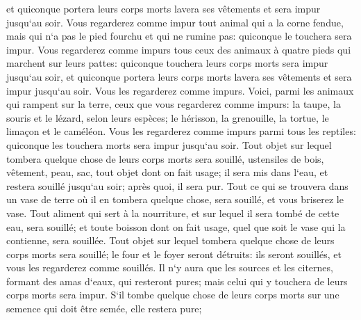 \verse et quiconque portera leurs corps morts lavera ses vêtements et sera impur jusqu`au soir. 
\verse Vous regarderez comme impur tout animal qui a la corne fendue, mais qui n`a pas le pied fourchu et qui ne rumine pas: quiconque le touchera sera impur. 
\verse Vous regarderez comme impurs tous ceux des animaux à quatre pieds qui marchent sur leurs pattes: quiconque touchera leurs corps morts sera impur jusqu`au soir, 
\verse et quiconque portera leurs corps morts lavera ses vêtements et sera impur jusqu`au soir. Vous les regarderez comme impurs. 
\verse Voici, parmi les animaux qui rampent sur la terre, ceux que vous regarderez comme impurs: la taupe, la souris et le lézard, selon leurs espèces; 
\verse le hérisson, la grenouille, la tortue, le limaçon et le caméléon. 
\verse Vous les regarderez comme impurs parmi tous les reptiles: quiconque les touchera morts sera impur jusqu`au soir. 
\verse Tout objet sur lequel tombera quelque chose de leurs corps morts sera souillé, ustensiles de bois, vêtement, peau, sac, tout objet dont on fait usage; il sera mis dans l`eau, et restera souillé jusqu`au soir; après quoi, il sera pur. 
\verse Tout ce qui se trouvera dans un vase de terre où il en tombera quelque chose, sera souillé, et vous briserez le vase. 
\verse Tout aliment qui sert à la nourriture, et sur lequel il sera tombé de cette eau, sera souillé; et toute boisson dont on fait usage, quel que soit le vase qui la contienne, sera souillée. 
\verse Tout objet sur lequel tombera quelque chose de leurs corps morts sera souillé; le four et le foyer seront détruits: ils seront souillés, et vous les regarderez comme souillés. 
\verse Il n`y aura que les sources et les citernes, formant des amas d`eaux, qui resteront pures; mais celui qui y touchera de leurs corps morts sera impur. 
\verse S`il tombe quelque chose de leurs corps morts sur une semence qui doit être semée, elle restera pure; 

